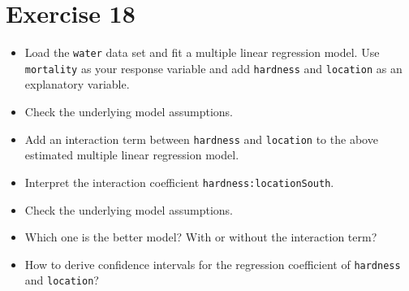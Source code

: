 \documentclass[11pt]{article}\usepackage[]{graphicx}\usepackage[]{color}
\begin{document}
\section*{Exercise 18}
\begin{itemize}
\item Load the \texttt{water} data set and fit a multiple linear regression model.
Use \texttt{mortality} as your response variable and add \texttt{hardness} and
\texttt{location} as an explanatory variable.

\item Check the underlying model assumptions.

\item Add an interaction term between \texttt{hardness} and \texttt{location}
to the above estimated multiple linear regression model.

\item Interpret the interaction coefficient \texttt{hardness:locationSouth}.
\item Check the underlying model assumptions.

\item Which one is the better model? With or without the interaction term?

\item How to derive confidence intervals for the regression coefficient
of \texttt{hardness} and \texttt{location}?

\end{itemize}
\end{document}
